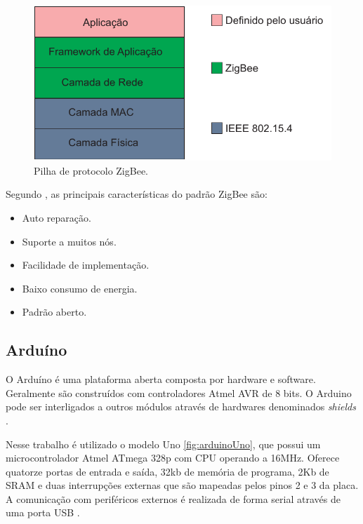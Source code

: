 \begin{figure}[htbp]
	\centering
		\includegraphics[scale=0.6]{referencial/figuras/pilhaZigbee.pdf}
	\caption{Pilha de protocolo ZigBee.}
	\label{fig:pilhaZigbee}
\end{figure}

Segundo \cite{Ramya:2011}, as principais características do padrão ZigBee são:


\begin{itemize}
  \item Auto reparação.
  \item Suporte a muitos nós.
  \item Facilidade de implementação.
  \item Baixo consumo de energia.
  \item Padrão aberto.
\end{itemize}

\subsection{Arduíno}

O Arduíno é uma plataforma aberta composta por hardware e software. Geralmente são construídos com controladores Atmel AVR de 8 bits. O Arduino pode ser interligados a outros módulos através de hardwares denominados \emph{shields} \cite{Arduino:2015}.

Nesse trabalho é utilizado o modelo Uno \ref{fig:arduinoUno}, que possui um microcontrolador Atmel ATmega 328p com CPU operando a 16MHz. Oferece quatorze portas de entrada e saída, 32kb de memória de programa, 2Kb de SRAM e duas interrupções externas que são mapeadas pelos pinos 2 e 3 da placa. A comunicação com periféricos externos é realizada de forma serial através de uma porta USB \cite{Arduino:2015}.

